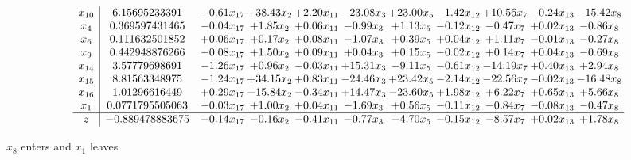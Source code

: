 \documentclass[9pt]{article}
\begin{document}
 \[\begin{array}{c| c c@{\hskip 2pt} c@{\hskip 2pt} c@{\hskip 2pt} c@{\hskip 2pt} c@{\hskip 2pt} c@{\hskip 2pt} c@{\hskip 2pt} c@{\hskip 2pt} c@{\hskip 2pt} }
 x_{10}   &  6.15695233391 & -0.61 x_{17} & + 38.43 x_{2} & +  2.20 x_{11} & -23.08 x_{3} & + 23.00 x_{5} & -1.42 x_{12} & + 10.56 x_{7} & -0.24 x_{13} & -15.42 x_{8}\\
 x_{4}   &  0.369597431465 & -0.04 x_{17} & +  1.85 x_{2} & +  0.06 x_{11} & -0.99 x_{3} & +  1.13 x_{5} & -0.12 x_{12} & -0.47 x_{7} & +  0.02 x_{13} & -0.86 x_{8}\\
 x_{6}   &  0.111632501852 & +  0.06 x_{17} & +  0.17 x_{2} & +  0.08 x_{11} & -1.07 x_{3} & +  0.39 x_{5} & +  0.04 x_{12} & +  1.11 x_{7} & -0.01 x_{13} & -0.27 x_{8}\\
 x_{9}   &  0.442948876266 & -0.08 x_{17} & +  1.50 x_{2} & +  0.09 x_{11} & +  0.04 x_{3} & +  0.15 x_{5} & -0.02 x_{12} & +  0.14 x_{7} & +  0.04 x_{13} & -0.69 x_{8}\\
 x_{14}   &  3.57779698691 & -1.26 x_{17} & +  0.96 x_{2} & -0.03 x_{11} & + 15.31 x_{3} & -9.11 x_{5} & -0.61 x_{12} & -14.19 x_{7} & +  0.40 x_{13} & +  2.94 x_{8}\\
 x_{15}   &  8.81563348975 & -1.24 x_{17} & + 34.15 x_{2} & +  0.83 x_{11} & -24.46 x_{3} & + 23.42 x_{5} & -2.14 x_{12} & -22.56 x_{7} & -0.02 x_{13} & -16.48 x_{8}\\
 x_{16}   &  1.01296616449 & +  0.29 x_{17} & -15.84 x_{2} & -0.34 x_{11} & + 14.47 x_{3} & -23.60 x_{5} & +  1.98 x_{12} & +  6.22 x_{7} & +  0.65 x_{13} & +  5.66 x_{8}\\
 x_{1}   &  0.0771795505063 & -0.03 x_{17} & +  1.00 x_{2} & +  0.04 x_{11} & -1.69 x_{3} & +  0.56 x_{5} & -0.11 x_{12} & -0.84 x_{7} & -0.08 x_{13} & -0.47 x_{8}\\
\hline
z    &  -0.889478883675 & -0.14 x_{17} & -0.16 x_{2} & -0.41 x_{11} & -0.77 x_{3} & -4.70 x_{5} & -0.15 x_{12} & -8.57 x_{7} & +  0.02 x_{13} & +  1.78 x_{8}\\
\end{array}\]


 $ x_{8} $ enters and $ x_{1} $ leaves 
\end{document}

